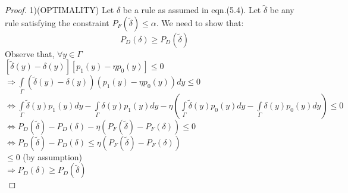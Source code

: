 \documentclass[12pt]{report}
\begin{document}
\begin{proof}
1)(OPTIMALITY) Let $\delta$ be a rule as assumed in eqn.(5.4). Let $\tilde{\delta}$ be any rule satisfying the constraint $P_F(\tilde{\delta})\leq\alpha$. We need to show that:$$P_D(\delta)\geq P_D(\tilde{\delta})$$
Observe that, $\forall y\in\Gamma$ \\

$[\tilde{\delta}(y)-\delta(y)][p_1(y)-\eta p_0(y)]\leq0$\\

$\Longrightarrow\int\limits_\Gamma(\tilde{\delta}(y)-\delta(y))(p_1(y)-\eta p_0(y))dy\leq0$\\

$\Longleftrightarrow\int\limits_\Gamma\tilde{\delta}(y)p_1(y)dy-\int\limits_\Gamma{\delta(y)}p_1(y)dy-\eta(\int\limits_\Gamma\tilde{\delta}(y)p_0(y)dy-\int\limits_\Gamma{\delta(y)}p_0(y)dy)\leq0$\\

$\Longleftrightarrow P_D(\tilde{\delta})-P_D(\delta)-\eta(P_F(\tilde{\delta})-P_F(\delta))\leq0$\\

$\Longleftrightarrow P_D(\tilde{\delta})-P_D(\delta) \leq \eta(P_F(\tilde{\delta})-P_F(\delta))$\\

$\leq0$ (by assumption)\\

$\Longrightarrow P_D(\delta)\geq P_D(\tilde{\delta})$\\


\end{proof}
\end{document}
